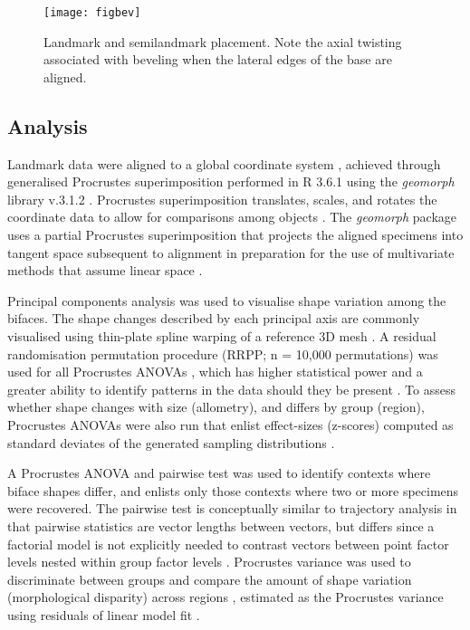 \documentclass[review]{elsarticle}
\begin{document}
\begin{figure}[ht]\centering
\texttt{[image: figbev]}
\caption{Landmark and semilandmark placement. Note the axial twisting associated with beveling when the lateral edges of the base are aligned.}
\label{fig:fig5}
\end{figure}

\subsection*{Analysis}

Landmark data were aligned to a global coordinate system \citep{RN11622,RN11623,RN11563}, achieved through generalised Procrustes superimposition \citep{RN478} performed in R 3.6.1 \citep{R} using the \textit{geomorph} library v.3.1.2 \citep{RN11530,RN1774}. Procrustes superimposition translates, scales, and rotates the coordinate data to allow for comparisons among objects \citep{RN11564,RN478}. The \textit{geomorph} package uses a partial Procrustes superimposition that projects the aligned specimens into tangent space subsequent to alignment in preparation for the use of multivariate methods that assume linear space \citep{RN1646,RN11563}.

Principal components analysis \citep{RN1746} was used to visualise shape variation among the bifaces. The shape changes described by each principal axis are commonly visualised using thin-plate spline warping of a reference 3D mesh \citep{RN1731,RN479}. A residual randomisation permutation procedure (RRPP; n = 10,000 permutations) was used for all Procrustes ANOVAs \citep{RN1655,RN11775}, which has higher statistical power and a greater ability to identify patterns in the data should they be present \citep{RN1719}. To assess whether shape changes with size (allometry), and differs by group (region), Procrustes ANOVAs \citep{RN1749} were also run that enlist effect-sizes (z-scores) computed as standard deviates of the generated sampling distributions \citep{RN1756}. 

A Procrustes ANOVA and pairwise test was used to identify contexts where biface shapes differ, and enlists only those contexts where two or more specimens were recovered. The pairwise test is conceptually similar to trajectory analysis \citep{RN11573,RN1648,RN1776,RN1739} in that pairwise statistics are vector lengths between vectors, but differs since a factorial model is not explicitly needed to contrast vectors between point factor levels nested within group factor levels \citep{RN11530}. Procrustes variance was used to discriminate between groups and compare the amount of shape variation (morphological disparity) across regions \citep{RN11560}, estimated as the Procrustes variance using residuals of linear model fit \citep{RN11530}.
\end{document}
